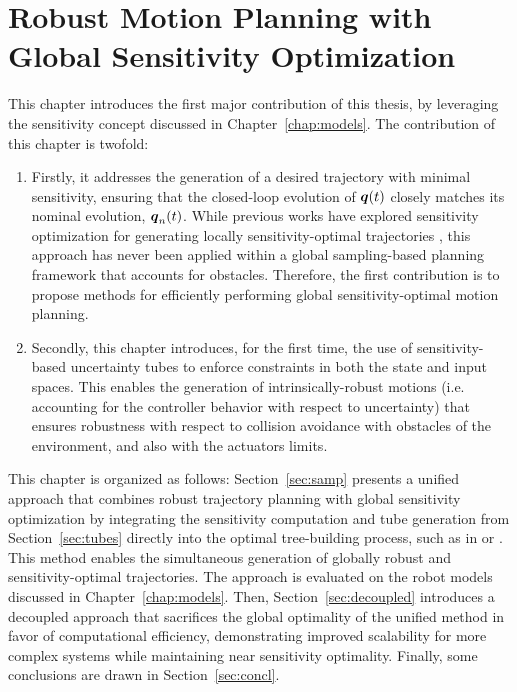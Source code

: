 \chapter{Robust Motion Planning with Global Sensitivity Optimization}\label{chap:samp}


This chapter introduces the first major contribution of this thesis, by leveraging the sensitivity concept discussed in Chapter~\ref{chap:models}.
The contribution of this chapter is twofold:
\begin{enumerate}
    \item Firstly, it addresses the generation of a desired trajectory with minimal sensitivity, ensuring that the closed-loop evolution of $\boldsymbol{q}(t)$ closely matches its nominal evolution, $\boldsymbol{q}_n(t)$. 
    While previous works have explored sensitivity optimization for generating locally sensitivity-optimal trajectories \cite{cPi,cTh}, this approach has never been applied within a global sampling-based planning framework that accounts for obstacles. 
    Therefore, the first contribution is to propose methods for efficiently performing global sensitivity-optimal motion planning.
    \item Secondly, this chapter introduces, for the first time, the use of sensitivity-based uncertainty tubes to enforce constraints in both the state and input spaces. 
    This enables the generation of intrinsically-robust motions (i.e. accounting for the controller behavior with respect to uncertainty) that ensures robustness with respect to collision avoidance with obstacles of the environment, and also with the actuators limits.
\end{enumerate}
This chapter is organized as follows: Section~\ref{sec:samp} presents a unified approach that combines robust trajectory planning with global sensitivity optimization by integrating the sensitivity computation and tube generation from Section~\ref{sec:tubes} directly into the optimal tree-building process, such as in  or . 
This method enables the simultaneous generation of globally robust and sensitivity-optimal trajectories. 
The approach is evaluated on the robot models discussed in Chapter~\ref{chap:models}.
Then, Section~\ref{sec:decoupled} introduces a decoupled approach that sacrifices the global optimality of the unified method in favor of computational efficiency, demonstrating improved scalability for more complex systems while maintaining near sensitivity optimality.
Finally, some conclusions are drawn in Section~\ref{sec:concl}.

